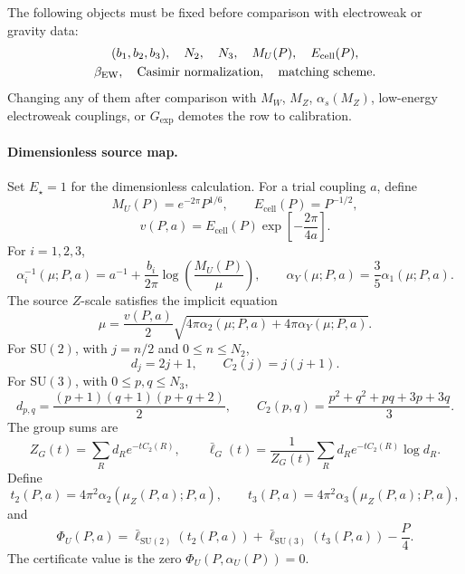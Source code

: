 \begin{definition}
The following objects must be fixed before comparison with electroweak or gravity data:
\[
\begin{gathered}
(b_1,b_2,b_3),\quad
N_2,\quad
N_3,\quad
M_U(P),\quad
E_{\mathrm{cell}}(P),\\
\beta_{\mathrm{EW}},\quad
\hbox{Casimir normalization},\quad
\hbox{matching scheme}.
\end{gathered}
\]
Changing any of them after comparison with \(M_W\), \(M_Z\), \(\alpha_s(M_Z)\), low-energy
electroweak couplings, or \(G_{\mathrm{exp}}\) demotes the row to calibration.
\end{definition}

\paragraph{Dimensionless source map.}
Set \(E_\star=1\) for the dimensionless calculation. For a trial coupling \(a\), define
\[
M_U(P)=e^{-2\pi}P^{1/6},
\qquad
E_{\mathrm{cell}}(P)=P^{-1/2},
\]
\[
v(P,a)=E_{\mathrm{cell}}(P)\exp\!\left[-\frac{2\pi}{4a}\right].
\]
For \(i=1,2,3\),
\[
\alpha_i^{-1}(\mu;P,a)
=
a^{-1}
+
\frac{b_i}{2\pi}\log\!\left(\frac{M_U(P)}{\mu}\right),
\qquad
\alpha_Y(\mu;P,a)=\frac35\alpha_1(\mu;P,a).
\]
The source \(Z\)-scale satisfies the implicit equation
\[
\mu
=
\frac{v(P,a)}{2}
\sqrt{4\pi\alpha_2(\mu;P,a)+4\pi\alpha_Y(\mu;P,a)}.
\]
For \(\mathrm{SU}(2)\), with \(j=n/2\) and \(0\le n\le N_2\),
\[
d_j=2j+1,\qquad C_2(j)=j(j+1).
\]
For \(\mathrm{SU}(3)\), with \(0\le p,q\le N_3\),
\[
d_{p,q}=\frac{(p+1)(q+1)(p+q+2)}{2},
\qquad
C_2(p,q)=\frac{p^2+q^2+pq+3p+3q}{3}.
\]
The group sums are
\[
Z_G(t)=\sum_R d_R e^{-tC_2(R)},
\qquad
\bar\ell_G(t)=
\frac{1}{Z_G(t)}
\sum_R d_R e^{-tC_2(R)}\log d_R.
\]
Define
\[
t_2(P,a)=4\pi^2\alpha_2(\mu_Z(P,a);P,a),
\qquad
t_3(P,a)=4\pi^2\alpha_3(\mu_Z(P,a);P,a),
\]
and
\[
\Phi_U(P,a)
=
\bar\ell_{\mathrm{SU}(2)}(t_2(P,a))
+
\bar\ell_{\mathrm{SU}(3)}(t_3(P,a))
-
\frac{P}{4}.
\]
The certificate value is the zero \(\Phi_U(P,\alpha_U(P))=0\).

